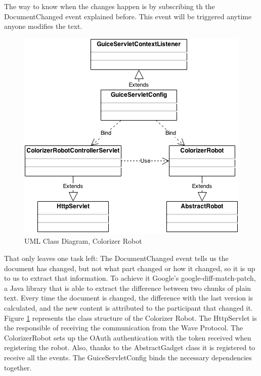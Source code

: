 The way to know when the changes happen is by subscribing th the DocumentChanged event explained before. This event will be triggered anytime anyone modifies the text.\\[.2cm]
\begin{figure}[H]
  \center
    \includegraphics[keepaspectratio, scale=0.5]{Media/Diagrams/Robot/Colorizer.png}
  \caption{UML Class Diagram, Colorizer Robot}
  \label{fig:colorizer_diagram}
\end{figure}
That only leaves one task left: The DocumentChanged event tells us the document has changed, but not what part changed or how it changed, so it is up to us to extract that information. To achieve it Google's google-diff-match-patch, a Java library that is able to extract the difference between two chunks of plain text. Every time the document is changed, the difference with the last version is calculated, and the new content is attributed to the participant that changed it.\\[.2cm]
Figure \ref{fig:colorizer_diagram} represents the class structure of the Colorizer Robot. The HttpServlet is the responsible of receiving the communication from the Wave Protocol. The ColorizerRobot sets up the OAuth authentication with the token received when registering the robot. Also, thanks to the AbstractGadget class it is registered to receive all the events. The GuiceServletConfig binds the necessary dependencies together.
